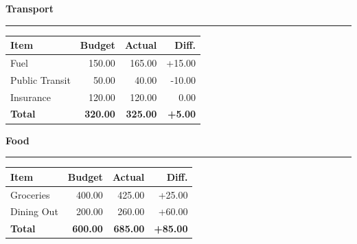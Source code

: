 \documentclass[11pt]{article}
\begin{document}
\begin{minipage}[t]{0.48\textwidth}
  {\large\textbf{\color{accent}Transport}} \par
  \vspace{0.2em}
  {\color{accent!30}\rule{\linewidth}{1.2pt}} \par
  \vspace{0.4em}
  \begin{tabularx}{\linewidth}{X r r r}
    \textbf{Item} & \textbf{Budget} & \textbf{Actual} & \textbf{Diff.} \\
    \midrule
    Fuel & 150.00 & 165.00 & +15.00 \\
    Public Transit & 50.00 & 40.00 & -10.00 \\
    Insurance & 120.00 & 120.00 & 0.00 \\
    \midrule
    \textbf{Total} & \textbf{320.00} & \textbf{325.00} & \textbf{+5.00} \\
  \end{tabularx}

  \vspace{1.5em}

  {\large\textbf{\color{accent}Food}} \par
  \vspace{0.2em}
  {\color{accent!30}\rule{\linewidth}{1.2pt}} \par
  \vspace{0.4em}
  \begin{tabularx}{\linewidth}{X r r r}
    \textbf{Item} & \textbf{Budget} & \textbf{Actual} & \textbf{Diff.} \\
    \midrule
    Groceries & 400.00 & 425.00 & +25.00 \\
    Dining Out & 200.00 & 260.00 & +60.00 \\
    \midrule
    \textbf{Total} & \textbf{600.00} & \textbf{685.00} & \textbf{+85.00} \\
  \end{tabularx}

\end{minipage}%
\hfill
\end{document}
